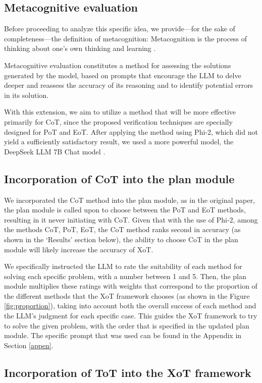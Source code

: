 \documentclass[10pt]{article} %
\begin{document}
\subsection{Metacognitive evaluation}
Before proceeding to analyze this specific idea, we provide—for the sake of completeness—the definition of metacognition: Metacognition is the process of thinking about one's own thinking and learning \citep{queensu_metacognition}.

Metacognitive evaluation constitutes a method for assessing the solutions generated by the model, based on prompts that encourage the LLM to delve deeper and reassess the accuracy of its reasoning and to identify potential errors in its solution.

With this extension, we aim to utilize a method that will be more effective primarily for CoT, since the proposed verification techniques are specially designed for PoT and EoT. After applying the method using Phi-2, which did not yield a sufficiently satisfactory result, we used a more powerful model, the DeepSeek LLM 7B Chat model \citep{deepseekai2024deepseek}.

\subsection{Incorporation of CoT into the plan module}

We incorporated the CoT method into the plan module, as in the original paper, the plan module is called upon to choose between the PoT and EoT methods, resulting in it never initiating with CoT. Given that with the use of Phi-2, among the methods CoT, PoT, EoT, the CoT method ranks second in accuracy (as shown in the `Results' section below), the ability to choose CoT in the plan module will likely increase the accuracy of XoT.

We specifically instructed the LLM to rate the suitability of each method for solving each specific problem, with a number between 1 and 5. Then, the plan module multiplies these ratings with weights that correspond to the proportion of the different methods that the XoT framework chooses (as shown in the Figure \ref{fig:proportion}), taking into account both the overall success of each method and the LLM's judgment for each specific case. This guides the XoT framework to try to solve the given problem, with the order that is specified in the updated plan module. The specific prompt that was used can be found in the Appendix in Section \ref{appen}.

\subsection{Incorporation of ToT into the XoT framework}
\end{document}
